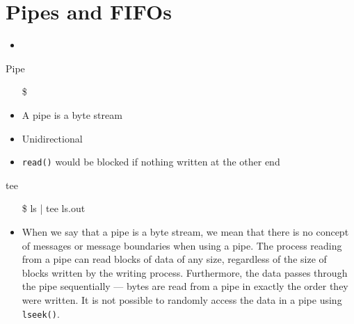 \section{Pipes and FIFOs}
\label{sec:pipes-fifos}

\begin{itemize}
\item {}
\end{itemize}

\begin{frame}{Pipe}
  \begin{itemize}
  \item[\$] 
  \end{itemize}
  \begin{center}
  \end{center}
  \begin{itemize}
  \item A pipe is a byte stream
  \item Unidirectional
  \item \texttt{read()} would be blocked if nothing written at the other end
  \end{itemize}
  \ttfamily
  \begin{block}{tee}
    \begin{center}
      \begin{minipage}{.35\linewidth}
        \begin{itemize}
        \item[\$] ls | tee ls.out
        \end{itemize}
      \end{minipage}\quad
      \begin{minipage}{.55\linewidth}
      \end{minipage}
    \end{center}
  \end{block}
\end{frame}

\begin{itemize}
\item When we say that a pipe is a byte stream, we mean that there is no concept of
  messages or message boundaries when using a pipe. The process reading from a pipe can
  read blocks of data of any size, regardless of the size of blocks written by the writing
  process. Furthermore, the data passes through the pipe sequentially --- bytes are read from
  a pipe in exactly the order they were written. It is not possible to randomly access the
  data in a pipe using \texttt{lseek()}. 
\end{itemize}


